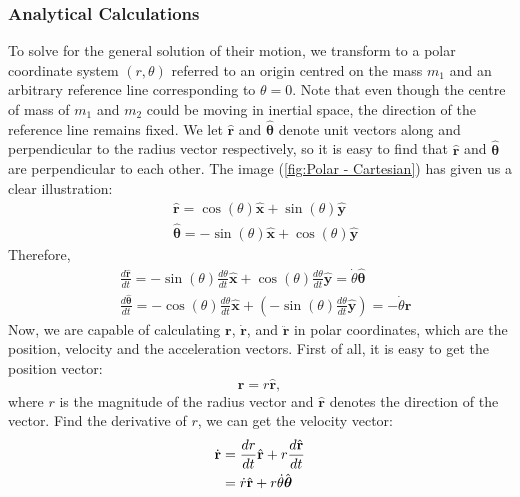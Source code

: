 \subsubsection{Analytical Calculations}
To solve for the general solution of their motion, we transform to a polar coordinate system $\left(r,\theta\right)$ referred to an origin centred on the mass $m_1$ and an arbitrary reference line corresponding to $\theta = 0$. Note that even though the centre of mass of $m_1$ and $m_2$ could be moving in inertial space, the direction of the reference line remains fixed. We let $\hat{\mathbf{r}}$ and $\hat{\boldsymbol{\theta}}$ denote unit vectors along and perpendicular to the radius vector respectively, so it is easy to find that $\hat{\mathbf{r}}$ and $\hat{\boldsymbol{\theta}}$ are perpendicular to each other. The image (\ref{fig:Polar - Cartesian}) has given us a clear illustration:
\begin{align}
    & \hat{\mathbf{r}} = \cos(\theta)\hat{\mathbf{x}} + \sin(\theta)\hat{\mathbf{y}}
    \label{hat mathbf r}\\
    & \hat{\boldsymbol{\theta}} = -\sin(\theta)\hat{\mathbf{x}} + \cos(\theta)\hat{\mathbf{y}}
    \label{hat mathbf theta}
\end{align}
Therefore,
\begin{align}
    & \frac{d\hat{\mathbf{r}}}{dt}
    = -\sin(\theta) \frac{d\theta}{dt}\hat{\mathbf{x}} + \cos(\theta) \frac{d\theta}{dt}\hat{\mathbf{y}}
    = \dot{\theta}\hat{\boldsymbol{\theta}}
    \label{Derivative of unit r}\\
    & \frac{d\hat{\boldsymbol{\theta}}}{dt}
    = -\cos(\theta) \frac{d\theta}{dt}\hat{\mathbf{x}} + (-\sin(\theta) \frac{d\theta}{dt}\hat{\mathbf{y}})
    = -\dot{\theta}\hat{\mathbf{r}}
    \label{Derivative of unit theta}
\end{align}
Now, we are capable of calculating $\mathbf{r}$, $\dot{\mathbf{r}}$, and $\ddot{\mathbf{r}}$ in polar coordinates, which are the position, velocity and the acceleration vectors. 
First of all, it is easy to get the position vector:
\begin{equation}
    \mathbf{r} = r \hat{\mathbf{r}},
    \label{polar coordinate position}
\end{equation}
where $r$ is the magnitude of the radius vector and $\hat{\mathbf{r}}$ denotes the direction of the vector.
Find the derivative of $r$, we can get the velocity vector:
\begin{align}
    \dot{\mathbf{r}} 
    & = \frac{dr}{dt}\hat{\mathbf{r}} + r\frac{d\hat{\mathbf{r}}}{dt} \notag\\
    & = \dot{r}\hat{\mathbf{r}} + r\dot{\theta}\hat{\boldsymbol{\theta}}
    \label{dot r}
\end{align}
